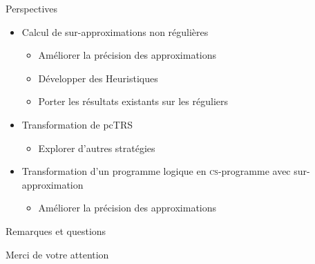 \documentclass[xcolor={dvipsnames}]{beamer}
\newcommand{\csprogramme}{\textsc{cs}-programme\xspace}
\begin{document}
\begin{frame}{Perspectives}
  \begin{itemize}[<+->]
  \item Calcul de sur-approximations non régulières
    \begin{itemize}
    \item Améliorer la précision des approximations
    \item Développer des Heuristiques
    \item Porter les résultats existants sur les réguliers
    \end{itemize}
  \item Transformation de pcTRS
    \begin{itemize}
      \item Explorer d'autres stratégies
    \end{itemize}
  \item Transformation d'un programme logique en \csprogramme avec sur-approximation
    \begin{itemize}
    \item Améliorer la précision des approximations
    \end{itemize}
  \end{itemize}
\end{frame}

\begin{frame}{Remarques et questions}
  \begin{center}
    Merci de votre attention
  \end{center}
\end{frame}
\end{document}
